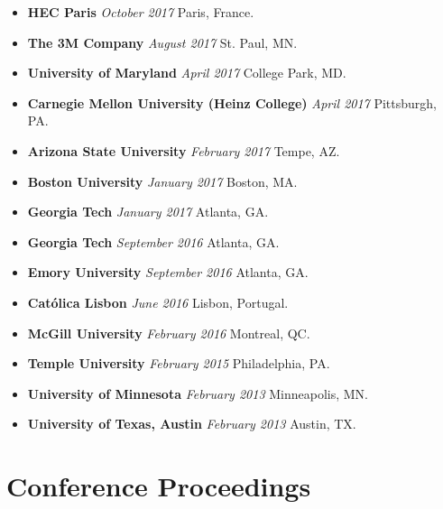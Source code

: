 \documentclass[10.5pt,letterpaper,sans]{moderncv}        %
\begin{document}
\begin{itemize}
\item \textbf{HEC Paris} \textit{October 2017} Paris, France.
\item \textbf{The 3M Company} \textit{August 2017} St. Paul, MN.
\item \textbf{University of Maryland} \textit{April 2017} College Park, MD.
\item \textbf{Carnegie Mellon University (Heinz College)} \textit{April 2017} Pittsburgh, PA.
\item \textbf{Arizona State University} \textit{February 2017} Tempe, AZ.
\item \textbf{Boston University} \textit{January 2017} Boston, MA.
\item \textbf{Georgia Tech} \textit{January 2017} Atlanta, GA.
\item \textbf{Georgia Tech} \textit{September 2016} Atlanta, GA.
\item \textbf{Emory University} \textit{September 2016} Atlanta, GA.
\item \textbf{Cat\'olica Lisbon} \textit{June 2016} Lisbon, Portugal.
\item \textbf{McGill University} \textit{February 2016} Montreal, QC.
\item \textbf{Temple University} \textit{February 2015} Philadelphia, PA.
\item \textbf{University of Minnesota} \textit{February 2013} Minneapolis, MN.
\item \textbf{University of Texas, Austin} \textit{February 2013} Austin, TX.

\end{itemize}

\section{Conference Proceedings}
\end{document}
